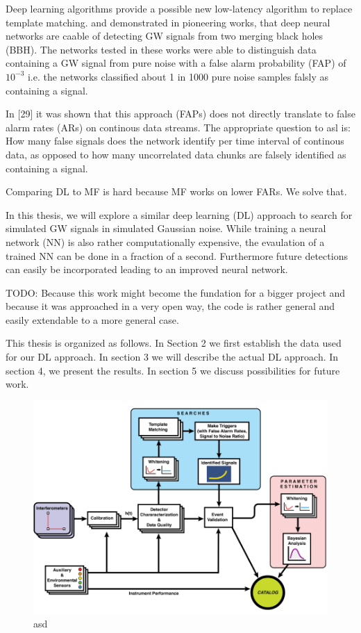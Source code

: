 Deep learning algorithms provide a possible new low-latency algorithm to replace
template matching. \cite{PhysRevD.95.104046} and \cite{PhysRevLett.120.141103}
demonstrated in pioneering works, that 
deep neural networks are caable of detecting GW signals from two merging
black holes (BBH). The networks tested in these works were able to distinguish
data containing a GW signal from pure noise with a false alarm probability (FAP)
of $10^{-3}$ i.e. the networks classified about 1 in 1000 pure noise samples
falsly as containing a signal.

In [29] it was shown that this approach (FAPs) does not directly translate to
false alarm rates (ARs) on continous data streams. The appropriate question to
asl is: How many false signals does the network identify per time interval of
continous data, as opposed to how many uncorrelated data chunks are falsely
identified as containing a signal. 

Comparing DL to MF is hard because MF works on lower FARs. We solve that.


In this thesis,
we will explore a similar deep learning (DL) approach to search for simulated GW
signals in simulated Gaussian noise. While training a neural network (NN) is also
rather computationally expensive, the evaulation of a trained NN can be done in
a fraction of a second. Furthermore future detections can easily be incorporated
leading to an improved neural network.

TODO: Because this work might become the fundation for a bigger project and
because it was approached in a very open way, the code is rather general and
easily extendable to a more general case.

This thesis is organized as follows. In Section 2 we first establish the data
used for our DL approach. In section 3 we will describe the actual DL approach.
In section 4, we present the results. In section 5 we discuss possibilities for 
future work.

\begin{figure}[h]
  \includegraphics[width=\textwidth]{img/1_introduction/data_processing.png}
  \caption{asd}
  \label{fig:1_data_processing}
  \centering
\end{figure}



